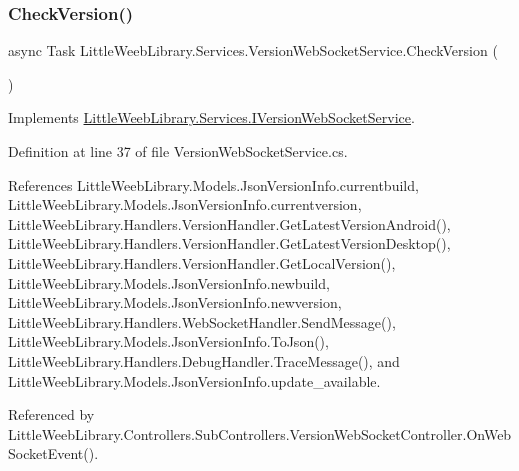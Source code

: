 \subsubsection{\texorpdfstring{Check\+Version()}{CheckVersion()}}
{\footnotesize\ttfamily async Task Little\+Weeb\+Library.\+Services.\+Version\+Web\+Socket\+Service.\+Check\+Version (\begin{DoxyParamCaption}{ }\end{DoxyParamCaption})}



Implements \mbox{\hyperlink{interface_little_weeb_library_1_1_services_1_1_i_version_web_socket_service_a8c4b2a561c8ddb900617466e83c0f957}{Little\+Weeb\+Library.\+Services.\+I\+Version\+Web\+Socket\+Service}}.



Definition at line 37 of file Version\+Web\+Socket\+Service.\+cs.



References Little\+Weeb\+Library.\+Models.\+Json\+Version\+Info.\+currentbuild, Little\+Weeb\+Library.\+Models.\+Json\+Version\+Info.\+currentversion, Little\+Weeb\+Library.\+Handlers.\+Version\+Handler.\+Get\+Latest\+Version\+Android(), Little\+Weeb\+Library.\+Handlers.\+Version\+Handler.\+Get\+Latest\+Version\+Desktop(), Little\+Weeb\+Library.\+Handlers.\+Version\+Handler.\+Get\+Local\+Version(), Little\+Weeb\+Library.\+Models.\+Json\+Version\+Info.\+newbuild, Little\+Weeb\+Library.\+Models.\+Json\+Version\+Info.\+newversion, Little\+Weeb\+Library.\+Handlers.\+Web\+Socket\+Handler.\+Send\+Message(), Little\+Weeb\+Library.\+Models.\+Json\+Version\+Info.\+To\+Json(), Little\+Weeb\+Library.\+Handlers.\+Debug\+Handler.\+Trace\+Message(), and Little\+Weeb\+Library.\+Models.\+Json\+Version\+Info.\+update\+\_\+available.



Referenced by Little\+Weeb\+Library.\+Controllers.\+Sub\+Controllers.\+Version\+Web\+Socket\+Controller.\+On\+Web\+Socket\+Event().


